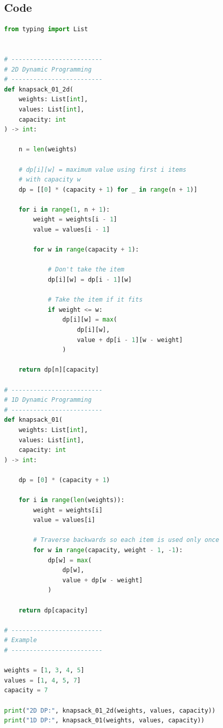 

\subsection*{Code}


\begin{lstlisting}[language=python]
from typing import List


# -------------------------
# 2D Dynamic Programming
# -------------------------
def knapsack_01_2d(
    weights: List[int],
    values: List[int],
    capacity: int
) -> int:

    n = len(weights)

    # dp[i][w] = maximum value using first i items
    # with capacity w
    dp = [[0] * (capacity + 1) for _ in range(n + 1)]

    for i in range(1, n + 1):
        weight = weights[i - 1]
        value = values[i - 1]

        for w in range(capacity + 1):

            # Don't take the item
            dp[i][w] = dp[i - 1][w]

            # Take the item if it fits
            if weight <= w:
                dp[i][w] = max(
                    dp[i][w],
                    value + dp[i - 1][w - weight]
                )

    return dp[n][capacity]

# -------------------------
# 1D Dynamic Programming
# -------------------------
def knapsack_01(
    weights: List[int],
    values: List[int],
    capacity: int
) -> int:

    dp = [0] * (capacity + 1)

    for i in range(len(weights)):
        weight = weights[i]
        value = values[i]

        # Traverse backwards so each item is used only once
        for w in range(capacity, weight - 1, -1):
            dp[w] = max(
                dp[w],
                value + dp[w - weight]
            )

    return dp[capacity]

# -------------------------
# Example
# -------------------------

weights = [1, 3, 4, 5]
values = [1, 4, 5, 7]
capacity = 7

print("2D DP:", knapsack_01_2d(weights, values, capacity))
print("1D DP:", knapsack_01(weights, values, capacity))

\end{lstlisting}

